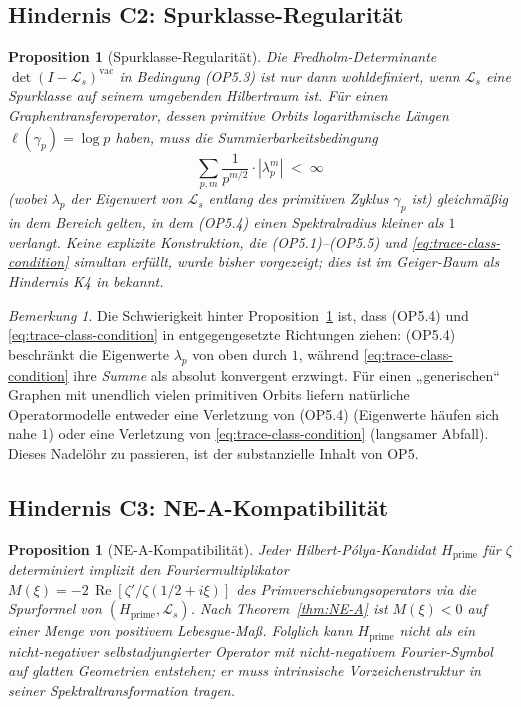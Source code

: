 \documentclass[11pt]{article}
\newtheorem{proposition}[theorem]{Proposition}
\theoremstyle{definition}
\theoremstyle{remark}
\newtheorem{remark}[theorem]{Bemerkung}
\renewcommand{\Re}{\operatorname{Re}}
\begin{document}
\subsection{Hindernis C2: Spurklasse-Regularität}
\label{sec:obs-C2}

\begin{proposition}[Spurklasse-Regularität]\label{prop:trace-class}
Die Fredholm-Determinante $\det(I - \mathcal{L}_s)^{\mathrm{vac}}$ in
Bedingung (OP5.3) ist nur dann wohldefiniert, wenn $\mathcal{L}_s$ eine
Spurklasse auf seinem umgebenden Hilbertraum ist. Für einen Graphentransferoperator,
dessen primitive Orbits logarithmische Längen
$\ell(\gamma_p) = \log p$ haben, muss die Summierbarkeitsbedingung
\begin{equation}
\label{eq:trace-class-condition}
  \sum_{p,m} \frac{1}{p^{m/2}} \cdot |\lambda_p^m|
  \;<\; \infty
\end{equation}
(wobei $\lambda_p$ der Eigenwert von $\mathcal{L}_s$ entlang des primitiven
Zyklus $\gamma_p$ ist) gleichmäßig in dem Bereich gelten, in dem (OP5.4)
einen Spektralradius kleiner als $1$ verlangt. Keine explizite Konstruktion,
die (OP5.1)--(OP5.5) und
\eqref{eq:trace-class-condition} simultan erfüllt, wurde bisher vorgezeigt; dies ist
im Geiger-Baum als Hindernis K4 in \cite{Geiger2026RHI} bekannt.
\end{proposition}

\begin{remark}\label{rem:trace-class-connection}
Die Schwierigkeit hinter Proposition~\ref{prop:trace-class} ist, dass
(OP5.4) und \eqref{eq:trace-class-condition} in entgegengesetzte
Richtungen ziehen: (OP5.4) beschränkt die Eigenwerte $\lambda_p$ von oben
durch $1$, während \eqref{eq:trace-class-condition} ihre
\emph{Summe} als absolut konvergent erzwingt. Für einen „generischen“ Graphen
mit unendlich vielen primitiven Orbits liefern natürliche Operatormodelle entweder
eine Verletzung von (OP5.4) (Eigenwerte häufen sich nahe $1$) oder
eine Verletzung von \eqref{eq:trace-class-condition} (langsamer Abfall). Dieses
Nadelöhr zu passieren, ist der substanzielle Inhalt von OP5.
\end{remark}

\subsection{Hindernis C3: NE-A-Kompatibilität}
\label{sec:obs-C3}

\begin{proposition}[NE-A-Kompatibilität]\label{prop:ne-a-compat}
Jeder Hilbert-P\'olya-Kandidat $H_\mathrm{prime}$ für $\zeta$ determiniert implizit
den Fouriermultiplikator
$M(\xi) = -2\,\Re[\zeta'/\zeta(1/2 + i\xi)]$ des Primverschiebungsoperators
via die Spurformel von $(H_\mathrm{prime}, \mathcal{L}_s)$.
Nach Theorem~\ref{thm:NE-A} ist $M(\xi) < 0$ auf einer Menge von positivem
Lebesgue-Maß. Folglich kann $H_\mathrm{prime}$ nicht als ein
nicht-negativer selbstadjungierter Operator mit nicht-negativem Fourier-Symbol
auf glatten Geometrien entstehen; er muss intrinsische Vorzeichenstruktur
in seiner Spektraltransformation tragen.
\end{proposition}
\end{document}
